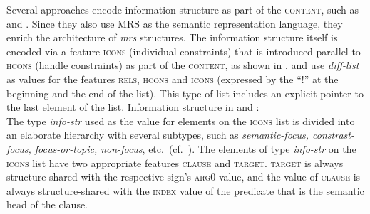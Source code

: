 \documentclass[output=paper
 	        ,biblatex
                ,babelshorthands
                ,newtxmath
                ,draftmode
                ,colorlinks, citecolor=brown
]{langscibook}
\begin{document}
Several approaches encode information structure as part of the \textsc{content},
such as \cite{song2018} and \cite{song-bender:2012}. Since they also
use MRS as the semantic representation language, they enrich the
architecture of \textit{mrs} structures. The information structure
itself is encoded via a feature  \textsc{icons} (individual
constraints) that is introduced parallel to  \textsc{hcons} (handle
constraints) as part of the \textsc{content}, as shown in
. \cite{song2018} and \cite{song-bender:2012}
use  \textit{diff-list} as values for the features \textsc{rels, hcons}
and \textsc{icons} (expressed by the ``!'' at the beginning and the
end of the list). This type of list includes an explicit pointer
to the last element of the list.
\ea\label{fig:song-infostruc}
Information structure in \cite{song-bender:2012} and \cite[116]{song2018}:\\
\z
The type  \textit{info-str} used as the value for elements on the
\textsc{icons} list is divided into an elaborate hierarchy with
several subtypes, such as \textit{semantic-focus, constrast-focus,
  focus-or-topic, non-focus}, etc.\ (cf.~\citealt[114]{song2018}). The
elements of type \textit{info-str} on the \textsc{icons} list have two
appropriate features \textsc{clause} and \textsc{target}. \textsc{target} is
always structure-shared with the respective sign's \textsc{arg0} value, and
the value of \textsc{clause} is always structure-shared with the
\textsc{index} value of the predicate that is the semantic head of the
clause.
\end{document}
